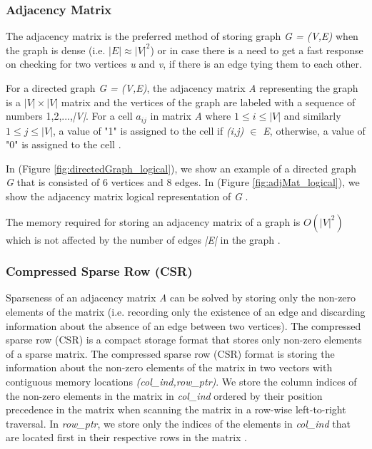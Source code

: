 {\subsubsection{Adjacency Matrix}
\label{subsubsec:AdjacencyMatrix}

The adjacency matrix is the preferred method of storing graph \textit{G = (V,E)} when the graph is dense (i.e. \textit{$|E| \approx |V|^2$}) or in case there is a need to get a fast response on checking for two vertices \textit{u} and \textit{v}, if there is an edge tying them to each other. 

For a directed graph \textit{G = (V,E)}, the adjacency matrix \textit{A} representing the graph is a \textit{$|V| \times |V|$} matrix and the vertices of the graph are labeled with a sequence of numbers 1,2,...,\textit{|V|}. For a cell \textit{$a_{ij}$} in matrix \textit{A} where \textit{$1 \leq i \leq |V|$} and similarly \textit{$1 \leq j \leq |V|$}, a value of "1" is assigned to the cell if \textit{(i,j) \(\in\) E}, otherwise, a value of "0" is assigned to the cell \cite{cormen2009introduction}.

In (Figure \ref{fig:directedGraph_logical}), we show an example of a directed graph \textit{G} that is consisted of 6 vertices and 8 edges. In (Figure \ref{fig:adjMat_logical}), we show the adjacency matrix logical representation of \textit{G} \cite{cormen2009introduction}. 

The memory required for storing an adjacency matrix of a graph is $O(|V|^2)$ which is not affected by the number of edges \textit{|E|} in the graph \cite{cormen2009introduction}.



\subsubsection{Compressed Sparse Row (CSR)}
\label{subsubsec:CSR}

Sparseness of an adjacency matrix \textit{A} can be solved by storing only the non-zero elements of the matrix (i.e. recording only the existence of an edge and discarding information about the absence of an edge between two vertices). The compressed sparse row (CSR) is a compact storage format that stores only non-zero elements of a sparse matrix. The compressed sparse row (CSR) format is storing the information about the non-zero elements of the matrix in two vectors with contiguous memory locations \textit{(col\_ind,row\_ptr)}. We store the column indices of the non-zero elements in the matrix in \textit{col\_ind} ordered by their position precedence in the matrix when scanning the matrix in a row-wise left-to-right traversal. In \textit{row\_ptr}, we store only the indices of the elements in \textit{col\_ind} that are located first in their respective rows in the matrix \cite{Bai:2000:TSA:357352,Paradies2017}.

}
